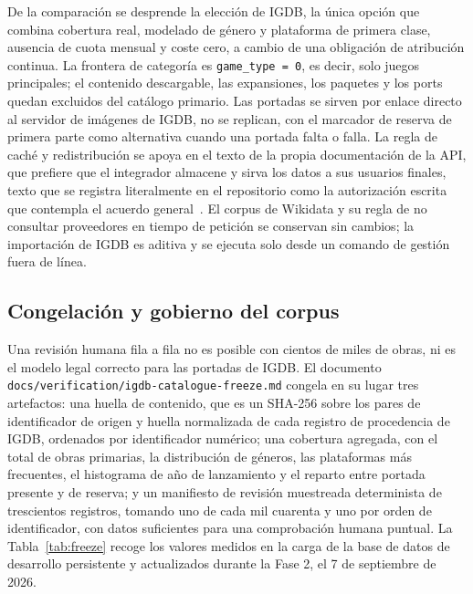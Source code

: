 De la comparación se desprende la elección de IGDB, la única opción que combina cobertura
real, modelado de género y plataforma de primera clase, ausencia de cuota mensual y coste
cero, a cambio de una obligación de atribución continua. La frontera de categoría es
\texttt{game\_type = 0}, es decir, solo juegos principales; el contenido descargable, las
expansiones, los paquetes y los ports quedan excluidos del catálogo primario. Las portadas se
sirven por enlace directo al servidor de imágenes de IGDB, no se replican, con el marcador de
reserva de primera parte como alternativa cuando una portada falta o falla. La
regla de caché y redistribución se apoya en el texto de la propia documentación de la API,
que prefiere que el integrador almacene y sirva los datos a sus usuarios finales, texto que
se registra literalmente en el repositorio como la autorización escrita que contempla el
acuerdo general~\cite{twitch-dsa}. El corpus de Wikidata y su regla de no consultar
proveedores en tiempo de petición se conservan sin cambios; la importación de IGDB es aditiva
y se ejecuta solo desde un comando de gestión fuera de línea.

\subsection{Congelación y gobierno del corpus}\label{sec:datos-congelacion}

Una revisión humana fila a fila no es posible con cientos de miles de obras, ni es el modelo
legal correcto para las portadas de IGDB. El documento
\texttt{docs/verification/igdb-catalogue-freeze.md} congela en su lugar tres artefactos: una
huella de contenido, que es un SHA-256 sobre los pares de identificador de origen y huella
normalizada de cada registro de procedencia de IGDB, ordenados por identificador numérico;
una cobertura agregada, con el total de obras primarias, la distribución de géneros, las
plataformas más frecuentes, el histograma de año de lanzamiento y el reparto entre portada
presente y de reserva; y un manifiesto de revisión muestreada determinista de trescientos
registros, tomando uno de cada mil cuarenta y uno por orden de identificador, con datos
suficientes para una comprobación humana puntual. La Tabla~\ref{tab:freeze} recoge los
valores medidos en la carga de la base de datos de desarrollo persistente y actualizados
durante la Fase 2, el 7 de septiembre de 2026.

